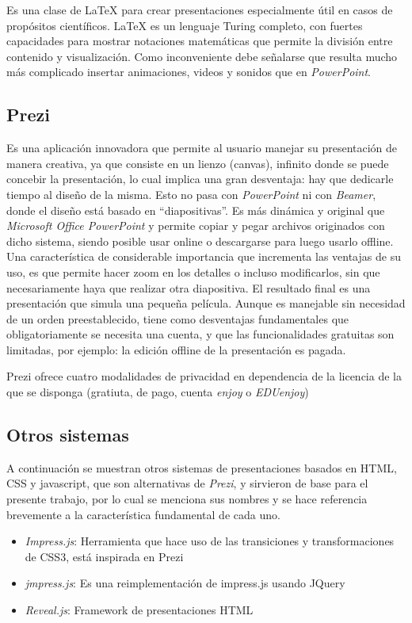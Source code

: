			Es una clase de \LaTeX{} para crear presentaciones especialmente útil en casos de propósitos científicos. \LaTeX{} es un lenguaje Turing completo, con fuertes capacidades para mostrar notaciones matemáticas que permite la división entre contenido y visualización. Como inconveniente debe señalarse que resulta mucho más complicado insertar animaciones, videos y sonidos que en \textit{PowerPoint}.	


		\subsection{Prezi} %
		\label{sub:prezi}

			Es una aplicación innovadora que permite al usuario manejar su presentación de manera creativa, ya que consiste en un lienzo (canvas), infinito donde se puede concebir la presentación, lo cual implica una gran desventaja: hay que dedicarle tiempo al diseño de la misma. Esto no pasa con \textit{PowerPoint} ni con \textit{Beamer}, donde el diseño está basado en ``diapositivas''. Es más dinámica y original que \textit{Microsoft Office PowerPoint} y permite copiar y pegar archivos originados con dicho sistema, siendo posible usar online o descargarse para luego usarlo offline.  Una característica de considerable importancia que incrementa las ventajas de su uso, es que permite hacer zoom en los detalles o incluso modificarlos, sin que necesariamente haya que realizar otra diapositiva. El resultado final es una presentación que simula una pequeña película. Aunque es manejable sin necesidad de un orden preestablecido, tiene como desventajas fundamentales que obligatoriamente se necesita una cuenta, y que las funcionalidades gratuitas son limitadas, por ejemplo: la edición offline de la presentación es pagada.

			Prezi ofrece cuatro modalidades de privacidad en dependencia de la licencia de la que se disponga (gratiuta, de pago, cuenta \textit{enjoy} o \textit{EDUenjoy})		


		\subsection{Otros sistemas} %
		\label{sub:otros_sistemas}
			A continuación se muestran otros sistemas de presentaciones basados en HTML, CSS y javascript, que son alternativas de \textit{Prezi}, y sirvieron de base para el presente trabajo, por lo cual se menciona sus nombres y se hace referencia brevemente a la característica fundamental de cada uno.
			\begin{itemize}
				\item \textit{Impress.js}: Herramienta que hace uso de las transiciones y transformaciones de CSS3, está inspirada en Prezi
				\item \textit{jmpress.js}: Es una reimplementación de impress.js usando JQuery
				\item \textit{Reveal.js}: Framework de presentaciones HTML
			\end{itemize}
	
